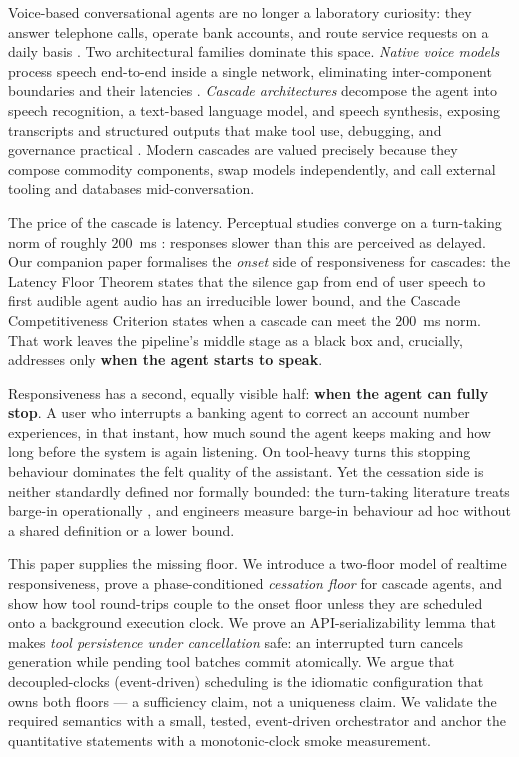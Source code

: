 Voice-based conversational agents are no longer a laboratory curiosity: they answer
telephone calls, operate bank accounts, and route service requests on a daily basis
\citep{openai2024realtimeapi,google2024geminivoice}.
Two architectural families dominate this space.
\emph{Native voice models} process speech end-to-end inside a single network, eliminating
inter-component boundaries and their latencies \citep{defossez2024moshi}.
\emph{Cascade architectures} decompose the agent into speech recognition, a text-based
language model, and speech synthesis, exposing transcripts and structured outputs that make
tool use, debugging, and governance practical \citep{yao2023react,langgraph2024}.
Modern cascades are valued precisely because they compose commodity components, swap
models independently, and call external tooling and databases mid-conversation.

The price of the cascade is latency.
Perceptual studies converge on a turn-taking norm of roughly $200$~ms
\citep{levinson2015timing,stivers2009universals}: responses slower than this are perceived as
delayed.
Our companion paper \citep{latencyfloor2025} formalises the \emph{onset} side of responsiveness for cascades: the
Latency Floor Theorem states that the silence gap from end of user speech to first audible
agent audio has an irreducible lower bound, and the Cascade Competitiveness Criterion states
when a cascade can meet the $200$~ms norm.
That work leaves the pipeline's middle stage as a black box and, crucially, addresses only
\textbf{when the agent starts to speak}.

Responsiveness has a second, equally visible half: \textbf{when the agent can fully stop}.
A user who interrupts a banking agent to correct an account number experiences, in that
instant, how much sound the agent keeps making and how long before the system is again
listening.
On tool-heavy turns this stopping behaviour dominates the felt quality of the assistant.
Yet the cessation side is neither standardly defined nor formally bounded: the turn-taking
literature treats barge-in operationally \citep{raux2008optimizing,skantze2021turn}, and
engineers measure barge-in behaviour ad hoc without a shared definition or a lower bound.

This paper supplies the missing floor.
We introduce a two-floor model of realtime responsiveness, prove a phase-conditioned
\emph{cessation floor} for cascade agents, and show how tool round-trips couple to the onset
floor unless they are scheduled onto a background execution clock.
We prove an API-serializability lemma that makes \emph{tool persistence under cancellation}
safe: an interrupted turn cancels generation while pending tool batches commit atomically.
We argue that decoupled-clocks (event-driven) scheduling is the idiomatic configuration that
owns both floors — a sufficiency claim, not a uniqueness claim.
We validate the required semantics with a small, tested, event-driven orchestrator and anchor
the quantitative statements with a monotonic-clock smoke measurement.


